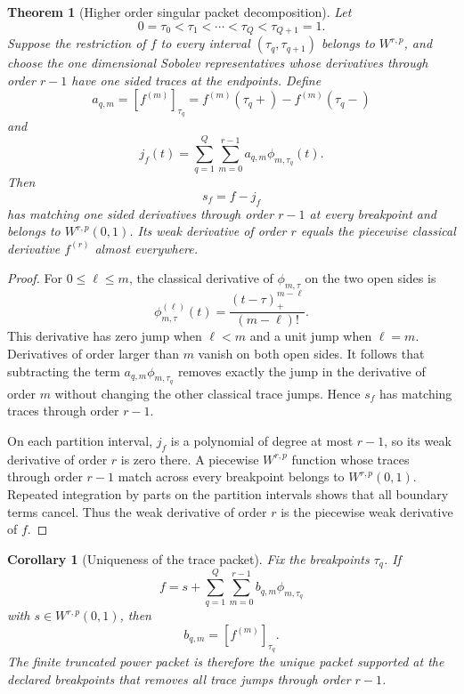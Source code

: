 \documentclass{aomart}
\newtheorem{theorem}{Theorem}[section]
\newtheorem{corollary}[corollary]{Corollary}
\theoremstyle{definition}
\theoremstyle{remark}
\newcommand{\jump}[1]{\left[#1\right]}
\begin{document}
\begin{theorem}[Higher order singular packet decomposition]\label{thm:higher_order_packet_decomposition}
Let
\[
0=\tau_0<\tau_1<\cdots<\tau_Q<\tau_{Q+1}=1.
\]
Suppose the restriction of \(f\) to every interval \((\tau_q,\tau_{q+1})\) belongs to \(W^{r,p}\), and choose the one dimensional Sobolev representatives whose derivatives through order \(r-1\) have one sided traces at the endpoints. Define
\[
a_{q,m}
=
\jump{f^{(m)}}_{\tau_q}
=
f^{(m)}(\tau_q+)-f^{(m)}(\tau_q-)
\]
and
\[
j_f(t)
=
\sum_{q=1}^{Q}\sum_{m=0}^{r-1}a_{q,m}\phi_{m,\tau_q}(t).
\]
Then
\[
s_f=f-j_f
\]
has matching one sided derivatives through order \(r-1\) at every breakpoint and belongs to \(W^{r,p}(0,1)\). Its weak derivative of order \(r\) equals the piecewise classical derivative \(f^{(r)}\) almost everywhere.
\end{theorem}

\begin{proof}
For \(0\leq \ell\leq m\), the classical derivative of \(\phi_{m,\tau}\) on the two open sides is
\[
\phi_{m,\tau}^{(\ell)}(t)
=
\frac{(t-\tau)_+^{m-\ell}}{(m-\ell)!}.
\]
This derivative has zero jump when \(\ell<m\) and a unit jump when \(\ell=m\). Derivatives of order larger than \(m\) vanish on both open sides. It follows that subtracting the term \(a_{q,m}\phi_{m,\tau_q}\) removes exactly the jump in the derivative of order \(m\) without changing the other classical trace jumps. Hence \(s_f\) has matching traces through order \(r-1\).

On each partition interval, \(j_f\) is a polynomial of degree at most \(r-1\), so its weak derivative of order \(r\) is zero there. A piecewise \(W^{r,p}\) function whose traces through order \(r-1\) match across every breakpoint belongs to \(W^{r,p}(0,1)\). Repeated integration by parts on the partition intervals shows that all boundary terms cancel. Thus the weak derivative of order \(r\) is the piecewise weak derivative of \(f\).
\end{proof}

\begin{corollary}[Uniqueness of the trace packet]\label{cor:trace_packet_uniqueness}
Fix the breakpoints \(\tau_q\). If
\[
f=s+\sum_{q=1}^{Q}\sum_{m=0}^{r-1}b_{q,m}\phi_{m,\tau_q}
\]
with \(s\in W^{r,p}(0,1)\), then
\[
b_{q,m}=\jump{f^{(m)}}_{\tau_q}.
\]
The finite truncated power packet is therefore the unique packet supported at the declared breakpoints that removes all trace jumps through order \(r-1\).
\end{corollary}
\end{document}
